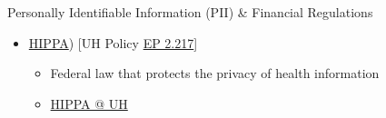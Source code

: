 \begin{frame}
\begin{block}{Personally Identifiable Information (PII)  \& Financial Regulations}
\begin{itemize}
    \item \href{Health Insurance Portability and Accountability Act (https://www.hhs.gov/hipaa/for-professionals/security/laws-regulations/index.html}{HIPPA}) [UH Policy \href{https://www.hawaii.edu/policy/index.php?action=viewPolicy\&policySection=ep\&policyChapter=2\&policyNumber=217\&menuView=closed}{EP 2.217}]
      \begin{itemize}
      \item Federal law that protects the privacy of health information
        \item \href{https://www.hawaii.edu/infosec/hipaa/}{HIPPA @ UH}
      \end{itemize}
    \end{itemize}  
  \end{block}
\end{frame}  




